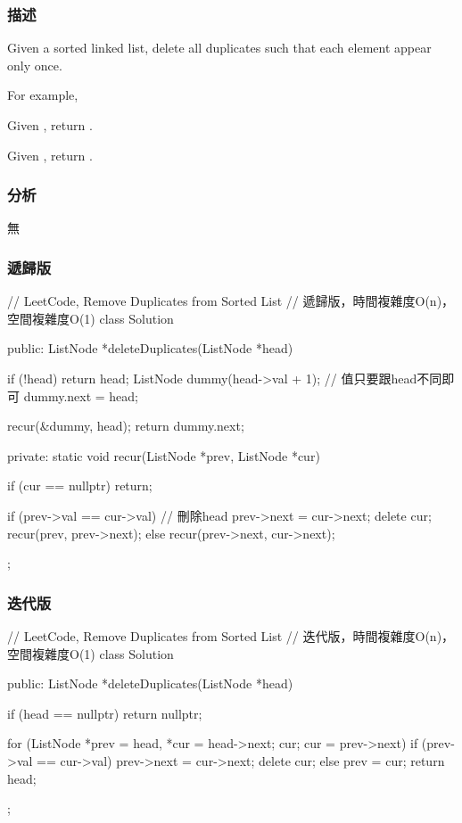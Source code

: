 \subsubsection{描述}
Given a sorted linked list, delete all duplicates such that each element appear only once.

For example,

Given , return .

Given , return .


\subsubsection{分析}
無


\subsubsection{遞歸版}
\begin{Code}
// LeetCode, Remove Duplicates from Sorted List
// 遞歸版，時間複雜度O(n)，空間複雜度O(1)
class Solution {
public:
    ListNode *deleteDuplicates(ListNode *head) {
        if (!head) return head;
        ListNode dummy(head->val + 1); // 值只要跟head不同即可
        dummy.next = head;

        recur(&dummy, head);
        return dummy.next;
    }
private:
    static void recur(ListNode *prev, ListNode *cur) {
        if (cur == nullptr) return;

        if (prev->val == cur->val) { // 刪除head
            prev->next = cur->next;
            delete cur;
            recur(prev, prev->next);
        } else {
            recur(prev->next, cur->next);
        }
    }
};
\end{Code}


\subsubsection{迭代版}
\begin{Code}
// LeetCode, Remove Duplicates from Sorted List
// 迭代版，時間複雜度O(n)，空間複雜度O(1)
class Solution {
public:
    ListNode *deleteDuplicates(ListNode *head) {
        if (head == nullptr) return nullptr;

        for (ListNode *prev = head, *cur = head->next; cur; cur = prev->next) {
            if (prev->val == cur->val) {
                prev->next = cur->next;
                delete cur;
            } else {
                prev = cur;
            }
        }
        return head;
    }
};
\end{Code}


